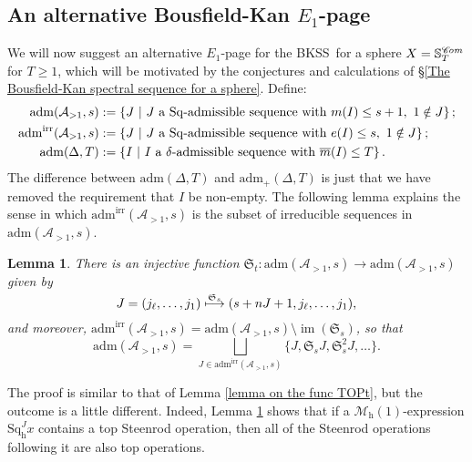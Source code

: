 \documentclass[11pt]{amsart} \renewcommand{\baselinestretch}{1.2}
\theoremstyle{plain}
\newtheorem{lem}[thm]{Lemma}
\numberwithin{equation}{section} %
\theoremstyle{plain}
\newtheorem{lem}[thm]{Lemma}
\numberwithin{equation}{chapter} %
\DeclareMathOperator{\im}{im}
\renewcommand{\to}{\longrightarrow}
\newcommand{\scrC}{\mathscr{C}}
\newcommand{\calA}{\mathcal{A}}
\newcommand{\calMh}{\mathcal{M}\dhor}
\newcommand{\minDimP}{\overline{m}}
\newcommand{\minDimDelta}{m}
\newcommand{\Sq}{\mathrm{Sq}}
\newcommand{\LieSteen}{\calA}
\newcommand{\aDT}{\mathrm{adm}_+(\Delta,T)}
\newcommand{\aDTnoplus}{\mathrm{adm}(\Delta,T)}
\newcommand{\aS}[2][1]{\mathrm{adm}(\LieSteen_{>#1},#2)}
\newcommand{\aSirr}[1]{\mathrm{adm}^\mathrm{irr}(\LieSteen_{>1},#1)}
\newcommand{\algs}{{\scrC\!\textit{\normalfont\textit{om}}}}
\newcommand{\STOP}{\mathfrak{S}}
\newcommand{\dhor}{_\mathrm{h}}
\newcommand{\Sqh}{\mathrm{Sq}\dhor}
\newcommand{\BKSS}{BKSS}
\newcommand{\SubsectionOrSection}[1]{\subsection{#1}}
\begin{document}
\begin{Calculations of HWn}
\SubsectionOrSection{An alternative Bousfield-Kan $E_1$-page}
\label{An alternative Bousfield-Kan E1}
We will now suggest an alternative $E_1$-page for the \BKSS\ for a  sphere  $X=\mathbb{S}_{T}^{\algs}$ for $T\geq1$, which will be motivated by the conjectures and calculations of \S\ref{The Bousfield-Kan spectral sequence for a sphere}. 
Define:
\begin{alignat*}{2}
\aS{s}&:=\left\{J\ \middle|\ \textup{$J$ a $\Sq$-admissible sequence with }\minDimDelta(I)\leq s+1,\ 1\notin J\right\};\\
\aSirr{s}&:=\left\{J\ \middle|\ \textup{$J$ a $\Sq$-admissible sequence with }e(I)\leq s,\ 1\notin J\right\};\\
\aDTnoplus&:=\left\{I\ \middle|\ \textup{$I$ a $\delta$-admissible sequence with }\minDimP(I)\leq T\right\}.
\end{alignat*}
The difference between $\aDTnoplus$ and $\aDT$ is just that we have removed the requirement that $I$ be non-empty. The following lemma explains the sense in which $\aSirr{s}$ is the subset of irreducible sequences in $\aS{s}$.
\begin{lem}
\label{lemma on the func STOPs}
There is an injective function $\STOP_t:\aS{s}\to \aS{s}$ given by
\[J=(j_{\ell},\ldots,j_1)\overset{\smash{\STOP_s}}{\longmapsto }(s+nJ+1,j_\ell,\ldots,j_1),\]
and moreover, $\aSirr{s}=\aS{s}\setminus\im(\STOP_s)$, so that
\[\aS{s}=\textstyle\bigsqcup_{J\in \aSirr{s}}\{J,\STOP_s J,\STOP_s^2 J,\ldots\}.\]
\end{lem}
\noindent The proof is similar to that of Lemma \ref{lemma on the func TOPt}, but the outcome is a little different. Indeed, Lemma \ref{lemma on the func STOPs} shows that if a $\calMh(1)$-expression $\Sqh^{J}x$ contains a top Steenrod operation, then all of the Steenrod operations following it are also top operations.


\end{Calculations of HWn}
\end{document}
